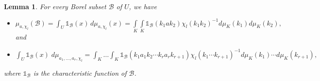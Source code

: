 \documentclass[11pt,a4paper]{amsart}
\newtheorem{lemma}[theorem]{Lemma}
\theoremstyle{definition}
\numberwithin{equation}{section}
\begin{document}
\begin{lemma}\label{Characteristic lemma}
For every Borel subset $\mathscr{B}$ of $U$, we have 

	\begin{itemize}  
	\item[(i)] 
	$
	\mu_{a, \chi_l}(\mathscr{B})=\int _{U}{\mathds{1}}_\mathscr{B}(x)\,d \mu_{a, \chi_l}(x) =\int\limits_{K}\int\limits_{K}{\mathds{1}}_\mathscr{B}\left(  k_{1}%
	ak_{2}\right) \chi_l\left(k_1k_2 \right)^{-1}   d\mu_K\left(  k_{1}\right)  d\mu_K\left(  k_{2}\right),
	$\\
	and \\
	
	\item[(ii)] 
	\begin{small}
	$
	\int_U {\mathds{1}}_\mathscr{B}(x) \;d\mu_{a_1, \dots ,  a_r, \chi_l}=\int_K  \dots\int_K {\mathds{1}}_\mathscr{B}\left(k_1a_1k_2\cdots k_ra_rk_{r+1} \right)\chi_l(k_1 \cdots k_{r+1})^{-1} d\mu_{K}\left(k_1 \right)  \cdots d\mu_{K}\left( k_{r+1}\right) ,
	$
	\end{small}
	\end{itemize}

where  ${\mathds{1}}_\mathscr{B}$ is the characteristic function of $\mathscr{B}$.


	 
	
	
\end{lemma}
\end{document}
